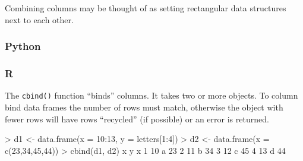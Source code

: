 \documentclass[
]{book}
\newenvironment{Shaded}{\begin{snugshade}}{\end{snugshade}}
\newcommand{\AttributeTok}[1]{\textcolor[rgb]{0.77,0.63,0.00}{#1}}
\newcommand{\DecValTok}[1]{\textcolor[rgb]{0.00,0.00,0.81}{#1}}
\newcommand{\FunctionTok}[1]{\textcolor[rgb]{0.00,0.00,0.00}{#1}}
\newcommand{\NormalTok}[1]{#1}
\newcommand{\OtherTok}[1]{\textcolor[rgb]{0.56,0.35,0.01}{#1}}
\newcommand{\SpecialCharTok}[1]{\textcolor[rgb]{0.00,0.00,0.00}{#1}}
\begin{document}
Combining columns may be thought of as setting rectangular data structures next to each other.

\hypertarget{python-24}{%
\subsubsection*{Python}\label{python-24}}

\hypertarget{r-24}{%
\subsubsection*{R}\label{r-24}}

The \texttt{cbind()} function ``binds'' columns. It takes two or more objects. To column bind data frames the number of rows must match, otherwise the object with fewer rows will have rows ``recycled'' (if possible) or an error is returned.

\begin{Shaded}
\begin{Highlighting}[]
\SpecialCharTok{\textgreater{}}\NormalTok{ d1 }\OtherTok{\textless{}{-}} \FunctionTok{data.frame}\NormalTok{(}\AttributeTok{x =} \DecValTok{10}\SpecialCharTok{:}\DecValTok{13}\NormalTok{, }\AttributeTok{y =}\NormalTok{ letters[}\DecValTok{1}\SpecialCharTok{:}\DecValTok{4}\NormalTok{])}
\SpecialCharTok{\textgreater{}}\NormalTok{ d2 }\OtherTok{\textless{}{-}} \FunctionTok{data.frame}\NormalTok{(}\AttributeTok{x =} \FunctionTok{c}\NormalTok{(}\DecValTok{23}\NormalTok{,}\DecValTok{34}\NormalTok{,}\DecValTok{45}\NormalTok{,}\DecValTok{44}\NormalTok{))}
\SpecialCharTok{\textgreater{}} \FunctionTok{cbind}\NormalTok{(d1, d2)}
\NormalTok{   x y  x}
\DecValTok{1} \DecValTok{10}\NormalTok{ a }\DecValTok{23}
\DecValTok{2} \DecValTok{11}\NormalTok{ b }\DecValTok{34}
\DecValTok{3} \DecValTok{12}\NormalTok{ c }\DecValTok{45}
\DecValTok{4} \DecValTok{13}\NormalTok{ d }\DecValTok{44}
\end{Highlighting}
\end{Shaded}
\end{document}
